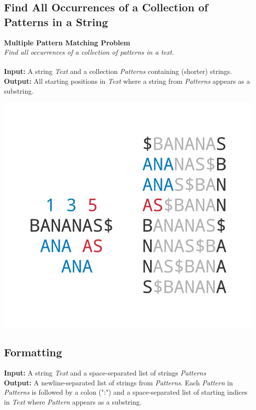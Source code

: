 \documentclass{article}
\begin{document}
\subsection{Find All Occurrences of a Collection of Patterns in a String}
\hline\vspace{5}
\noindent \textbf{Multiple Pattern Matching Problem} \\
\emph{Find all occurrences of a collection of patterns in a text.}\\ \\
\textbf{Input:} A string \emph{Text} and a collection \emph{Patterns} containing (shorter) strings. \\
\textbf{Output:} All starting positions in \emph{Text} where a string from \emph{Patterns} appears as a substring.
\begin{center}
    \includegraphics[scale=0.2]{c9/logos/9N.png} 
\end{center}
\hline\vspace{5}

\subsection*{Formatting}
\textbf{Input:} A string \emph{Text} and a space-separated list of strings \emph{Patterns}\\
\noindent\textbf{Output:} A newline-separated list of strings from \emph{Patterns}. Each \emph{Pattern} in \emph{Patterns} is followed by a colon (":") and a space-separated list of starting indices in \emph{Text} where \emph{Pattern} appears as a substring.
\end{document}
